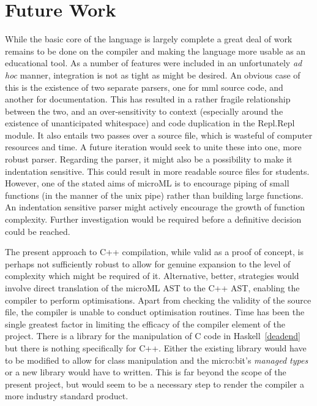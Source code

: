 \documentclass[12pt, a4paper]{report}
\begin{document}
\section{Future Work}
While the basic core of the language is largely complete a great deal of work remains to be done on
the compiler and making the language more usable as an educational tool. As a number of features
were included in an unfortunately \textit{ad hoc} manner, integration is not as tight as might be
desired. An obvious case of this is the existence of two separate parsers, one for mml source code,
and another for documentation. This has resulted in a rather fragile relationship between the two,
and an over-sensitivity to context (especially around the existence of unanticipated whitespace)
and code duplication in the Repl.Repl module. It also entails two passes over a source file, which
is wasteful of computer resources and time. A future iteration would seek to unite these into one,
more robust parser. Regarding the parser, it might also be a possibility to make it indentation
sensitive. This could result in more readable source files for students. However, one of the stated
aims of microML is to encourage piping of small functions (in the manner of the unix pipe) rather
than building large functions. An indentation sensitive parser might actively encourage the growth
of function complexity. Further investigation would be required before a definitive decision could
be reached.

The present approach to C++ compilation, while valid as a proof of concept, is perhaps not
sufficiently robust to allow for genuine expansion to the level of complexity which might be
required of it. Alternative, better, strategies would involve direct translation of the microML AST
to the C++ AST, enabling the compiler to perform optimisations. Apart from checking the validity of
the source file, the compiler is unable to conduct optimisation routines. Time has been the single
greatest factor in limiting the efficacy of the compiler element of the project. There is a library
for the manipulation of C code in Haskell~\ref{deadend} but there is nothing specifically for C++.
Either the existing library would have to be modified to allow for class manipulation and the
micro:bit's \textit{managed types} or a new library would have to written. This is far beyond the
scope of the present project, but would seem to be a necessary step to render the compiler a more
industry standard product.
\end{document}
